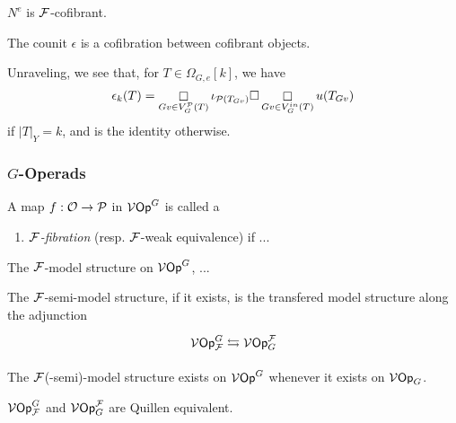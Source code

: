 \documentclass[a4paper,10pt]{article}%
\begin{document}
\begin{corollary}
  \label{N_E_COFIBRANT_PROP}
  $N^e$ is $\F$-cofibrant.
\end{corollary}


\begin{proposition}
  \label{EPSILON_COFIB_LEMMA}
  The counit $\epsilon$ is a cofibration between cofibrant objects.
\end{proposition}



Unraveling, we see that, for $T\in \Omega_{G,e}[k]$, we have
\[
\epsilon_k(T) = \mathop{\square}\limits_{Gv \in V_G^\P(T)} \iota_{\P(T_{Gv})} \square \mathop\square\limits_{Gv \in V_G^{in}(T)}u(T_{Gv}) 
\]
if $|T|_Y = k$, and is the identity otherwise.














\subsubsection{$G$-Operads}
\begin{definition}
  A map $f: \O \to \P$ in $\V\Op^G$ is called a 
  \begin{enumerate}
  \item \textit{$\F$-fibration} (resp. $\F$-weak equivalence) if ...
  \end{enumerate}
\end{definition}
\begin{definition}
  The $\F$-model structure on $\V\Op^G$, ...
\end{definition}

\begin{lemma}
  The $\F$-semi-model structure, if it exists, is the transfered model structure along the adjunction
\[
\begin{tikzcd}
  \V\Op^G_\F \leftrightarrows \V\Op_G^\F
\end{tikzcd}
\]
\end{lemma}
\begin{corollary}
  The $\F$(-semi)-model structure exists on $\V\Op^G$ whenever it exists on $\V\Op_G$.
\end{corollary}
\begin{theorem}
  $\V\Op^G_\F$ and $\V\Op_G^\F$ are Quillen equivalent.
\end{theorem}
\end{document}
